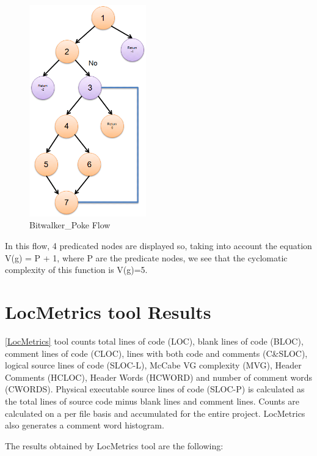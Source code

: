 \begin{figure}[H]
\centering
\includegraphics[width=0.45\textwidth]{./figures/flow.png}
\caption{Bitwalker\_Poke Flow}
\end{figure}

In this flow, 4 predicated nodes are displayed so, taking into account the equation V(g) = P + 1, where P are the predicate nodes, we see that the cyclomatic complexity of this function is V(g)=5.

\section{LocMetrics tool Results}

\href{http://www.locmetrics.com/}{[LocMetrics]} tool counts total lines of code (LOC), blank lines of code (BLOC), comment lines of code (CLOC), lines with both code and comments (C\&SLOC), logical source lines of code (SLOC-L), McCabe VG complexity (MVG), Header Comments (HCLOC), Header Words (HCWORD) and number of comment words (CWORDS). Physical executable source lines of code (SLOC-P) is calculated as the total lines of source code minus blank lines and comment lines. Counts are calculated on a per file basis and accumulated for the entire project. LocMetrics also generates a comment word histogram.

The results obtained by LocMetrics tool are the following:


